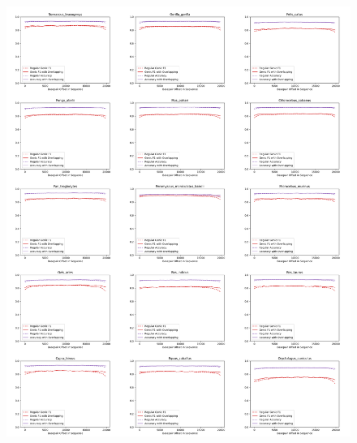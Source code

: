 \documentclass{article}
\begin{document}
\begin{figure}[!h]
\centerline{\includegraphics[width=\overlapscale\textwidth]{images/overlapping/montage_animals2}}
\end{figure}
\end{document}
